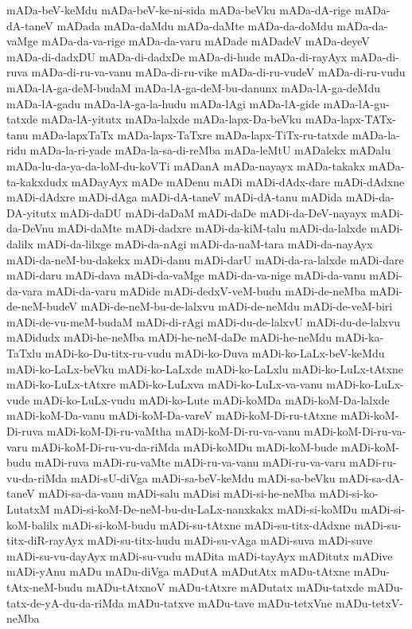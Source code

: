 {mADa-beV-keMdu
mADa-beV-ke-ni-sida
mADa-beVku
mADa-dA-rige
mADa-dA-taneV
mADada
mADa-daMdu
mADa-daMte
mADa-da-doMdu
mADa-da-vaMge
mADa-da-va-rige
mADa-da-varu
mADade
mADadeV
mADa-deyeV
mADa-di-dadxDU
mADa-di-dadxDe
mADa-di-hude
mADa-di-rayAyx
mADa-di-ruva
mADa-di-ru-va-vanu
mADa-di-ru-vike
mADa-di-ru-vudeV
mADa-di-ru-vudu
mADa-lA-ga-deM-budaM
mADa-lA-ga-deM-bu-danunx
mADa-lA-ga-deMdu
mADa-lA-gadu
mADa-lA-ga-la-hudu
mADa-lAgi
mADa-lA-gide
mADa-lA-gu-tatxde
mADa-lA-yitutx
mADa-lalxde
mADa-lapx-Da-beVku
mADa-lapx-TATx-tanu
mADa-lapxTaTx
mADa-lapx-TaTxre
mADa-lapx-TiTx-ru-tatxde
mADa-la-ridu
mADa-la-ri-yade
mADa-la-sa-di-reMba
mADa-leMtU
mADalekx
mADalu
mADa-lu-da-ya-da-loM-du-koVTi
mADanA
mADa-nayayx
mADa-takakx
mADa-ta-kakxdudx
mADayAyx
mADe
mADenu
mADi
mADi-dAdx-dare
mADi-dAdxne
mADi-dAdxre
mADi-dAga
mADi-dA-taneV
mADi-dA-tanu
mADida
mADi-da-DA-yitutx
mADi-daDU
mADi-daDaM
mADi-daDe
mADi-da-DeV-nayayx
mADi-da-DeVnu
mADi-daMte
mADi-dadxre
mADi-da-kiM-talu
mADi-da-lalxde
mADi-dalilx
mADi-da-lilxge
mADi-da-nAgi
mADi-da-naM-tara
mADi-da-nayAyx
mADi-da-neM-bu-dakekx
mADi-danu
mADi-darU
mADi-da-ra-lalxde
mADi-dare
mADi-daru
mADi-dava
mADi-da-vaMge
mADi-da-va-nige
mADi-da-vanu
mADi-da-vara
mADi-da-varu
mADide
mADi-dedxV-veM-budu
mADi-de-neMba
mADi-de-neM-budeV
mADi-de-neM-bu-de-lalxvu
mADi-de-neMdu
mADi-de-veM-biri
mADi-de-vu-meM-budaM
mADi-di-rAgi
mADi-du-de-lalxvU
mADi-du-de-lalxvu
mADidudx
mADi-he-neMba
mADi-he-neM-daDe
mADi-he-neMdu
mADi-ka-TaTxlu
mADi-ko-Du-titx-ru-vudu
mADi-ko-Duva
mADi-ko-LaLx-beV-keMdu
mADi-ko-LaLx-beVku
mADi-ko-LaLxde
mADi-ko-LaLxlu
mADi-ko-LuLx-tAtxne
mADi-ko-LuLx-tAtxre
mADi-ko-LuLxva
mADi-ko-LuLx-va-vanu
mADi-ko-LuLx-vude
mADi-ko-LuLx-vudu
mADi-ko-Lute
mADi-koMDa
mADi-koM-Da-lalxde
mADi-koM-Da-vanu
mADi-koM-Da-vareV
mADi-koM-Di-ru-tAtxne
mADi-koM-Di-ruva
mADi-koM-Di-ru-vaMtha
mADi-koM-Di-ru-va-vanu
mADi-koM-Di-ru-va-varu
mADi-koM-Di-ru-vu-da-riMda
mADi-koMDu
mADi-koM-bude
mADi-koM-budu
mADi-ruva
mADi-ru-vaMte
mADi-ru-va-vanu
mADi-ru-va-varu
mADi-ru-vu-da-riMda
mADi-sU-diVga
mADi-sa-beV-keMdu
mADi-sa-beVku
mADi-sa-dA-taneV
mADi-sa-da-vanu
mADi-salu
mADisi
mADi-si-he-neMba
mADi-si-ko-LutatxM
mADi-si-koM-De-neM-bu-du-LaLx-nanxkakx
mADi-si-koMDu
mADi-si-koM-balilx
mADi-si-koM-budu
mADi-su-tAtxne
mADi-su-titx-dAdxne
mADi-su-titx-diR-rayAyx
mADi-su-titx-hudu
mADi-su-vAga
mADi-suva
mADi-suve
mADi-su-vu-dayAyx
mADi-su-vudu
mADita
mADi-tayAyx
mADitutx
mADive
mADi-yAnu
mADu
mADu-diVga
mADutA
mADutAtx
mADu-tAtxne
mADu-tAtx-neM-budu
mADu-tAtxnoV
mADu-tAtxre
mADutatx
mADu-tatxde
mADu-tatx-de-yA-du-da-riMda
mADu-tatxve
mADu-tave
mADu-tetxVne
mADu-tetxV-neMba
}
